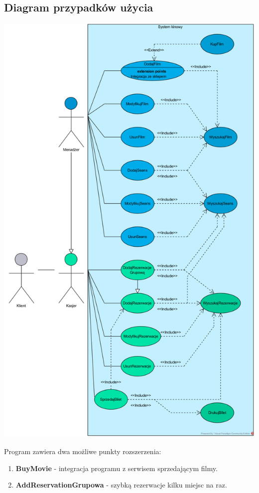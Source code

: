 \documentclass{article}
\begin{document}
	\subsection{Diagram przypadków użycia}
	\begin{center}
		\includegraphics[scale=0.8, center]{UC-2}
	\end{center}
	\par Program zawiera dwa możliwe punkty rozszerzenia:
	\begin{enumerate}
		\item \textbf{BuyMovie} - integracja programu z serwisem sprzedającym filmy.
		\item \textbf{AddReservationGrupowa} - szybką rezerwacje kilku miejsc na raz.
	\end{enumerate}
	
\end{document}
